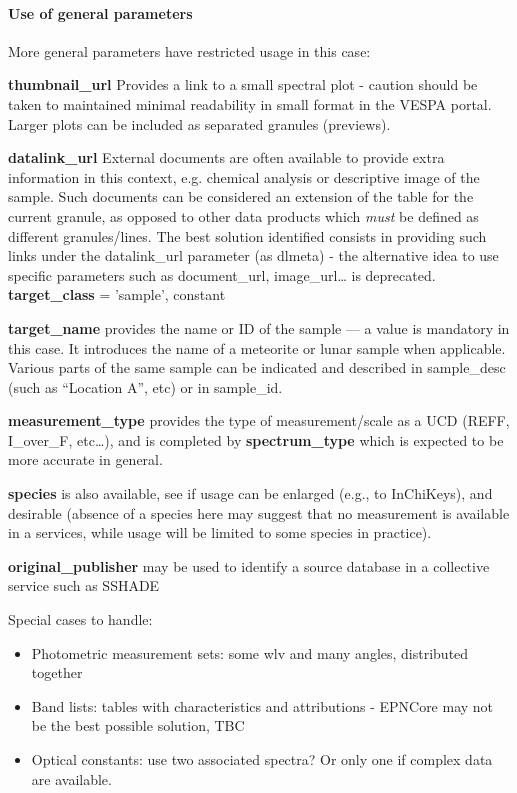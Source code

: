 \documentclass[11pt,a4paper]{ivoa}
\begin{document}
\paragraph{Use of general parameters\textbf{ }}

More general parameters have restricted usage in this case:

\textbf{thumbnail\_url }Provides a link to a small spectral plot - caution should be taken to maintained minimal readability in small format in the VESPA portal. Larger plots can be included as separated granules (previews).

\textbf{datalink\_url} External documents are often available to provide extra information in this context, e.g. chemical analysis or descriptive image of the sample. Such documents can be considered an extension of the table for the current granule, as opposed to other data products which \emph{must} be defined as different granules/lines. The best solution identified consists in providing such links under the datalink\_url parameter (as dlmeta)  - the alternative idea to use specific parameters such as document\_url, image\_url… is deprecated.\\

\textbf{target\_class }= 'sample', constant

\textbf{target\_name }provides the name or ID of the sample — a value is mandatory in this case. It introduces the name of a meteorite or lunar sample when applicable. Various parts of the same sample can be indicated and described in sample\_desc (such as ``Location A'', etc) or in sample\_id.

\textbf{measurement\_type} provides the type of measurement/scale as a UCD (REFF, I\_over\_F, etc…), and is completed by \textbf{spectrum\_type} which is expected to be more accurate in general.

\textbf{species} is also available, see if usage can be enlarged (e.g., to InChiKeys), and desirable (absence of a species here may suggest that no measurement is available in a services, while usage will be limited to some species in practice).

\textbf{original\_publisher }may be used to identify a source database in a collective service such as SSHADE


Special cases to handle:

\begin{itemize}

\item Photometric measurement sets: some wlv and many angles, distributed together

\item Band lists: tables with characteristics and attributions - EPNCore may not be the best possible solution, TBC

\item Optical constants: use two associated spectra? Or only one if complex data are available.

\end{itemize}
\end{document}
